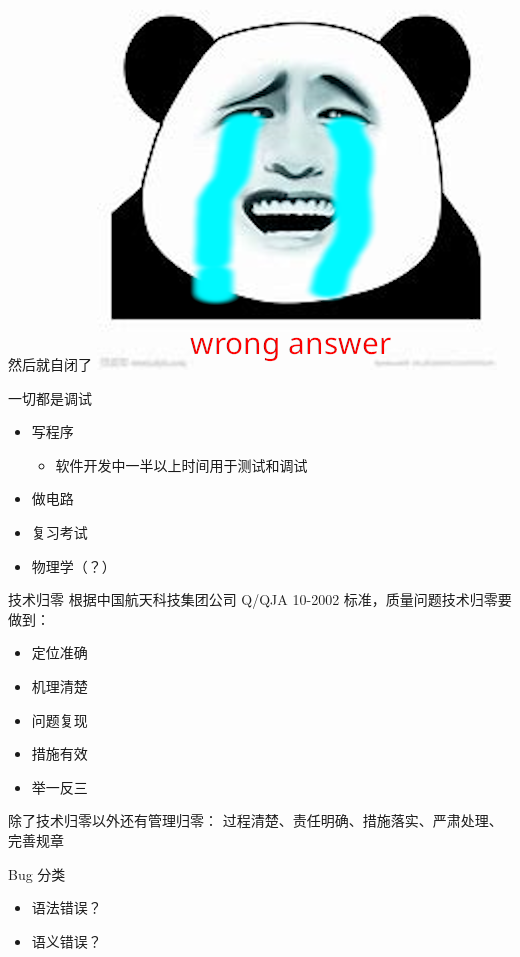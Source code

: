 \documentclass[10pt,mathserif]{beamer}%
\begin{document}
\begin{frame}{然后就自闭了}
	\center
	\includegraphics[width=.6\textwidth]{img/wa.png}
\end{frame}

\begin{frame}{一切都是调试}
	\begin{itemize}
		\item 写程序
			\begin{itemize}
				\item 软件开发中一半以上时间用于测试和调试
			\end{itemize}
		\item 做电路
		\item 复习考试
		\item 物理学（？）
	\end{itemize}
\end{frame}

\begin{frame}{技术归零}
	根据中国航天科技集团公司 Q/QJA 10-2002 标准，质量问题技术归零要做到：
	\begin{itemize}
		\item 定位准确
		\item 机理清楚
		\item 问题复现
		\item 措施有效
		\item 举一反三
	\end{itemize}
	\tiny 除了技术归零以外还有管理归零：
	过程清楚、责任明确、措施落实、严肃处理、完善规章
\end{frame}

\begin{frame}{Bug 分类}
	\begin{itemize}
		\item 语法错误？
		\item 语义错误？
	\end{itemize}
\end{frame}
\end{document}
